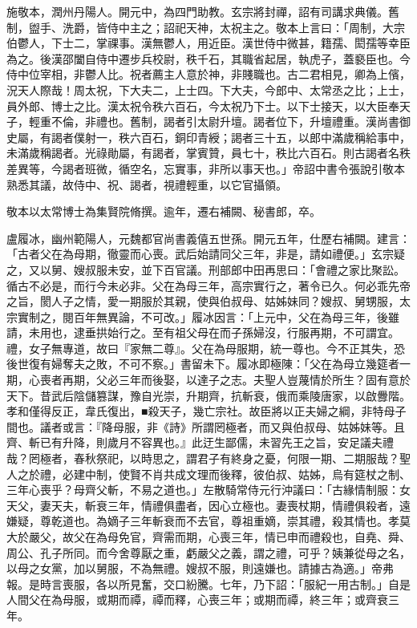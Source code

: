 \begin{pinyinscope}
 施敬本，潤州丹陽人。開元中，為四門助教。玄宗將封禪，詔有司講求典儀。舊制，盥手、洗爵，皆侍中主之；詔祀天神，太祝主之。敬本上言曰：「周制，大宗伯鬱人，下士二，掌祼事。漢無鬱人，用近臣。漢世侍中微甚，籍孺、閎孺等幸臣為之。後漢邵闔自侍中遷步兵校尉，秩千石，其職省起居，執虎子，蓋褻臣也。今侍中位宰相，非鬱人比。祝者薦主人意於神，非賤職也。古二君相見，卿為上儐，況天人際哉！周太祝，下大夫二，上士四。下大夫，今郎中、太常丞之比；上士，員外郎、博士之比。漢太祝令秩六百石，今太祝乃下士。以下士接天，以大臣奉天子，輕重不倫，非禮也。舊制，謁者引太尉升壇。謁者位下，升壇禮重。漢尚書御史屬，有謁者僕射一，秩六百石，銅印青綬；謁者三十五，以郎中滿歲稱給事中，未滿歲稱謁者。光祿勛屬，有謁者，掌賓贊，員七十，秩比六百石。則古謁者名秩差異等，今謁者班微，循空名，忘實事，非所以事天也。」帝詔中書令張說引敬本熟悉其議，故侍中、祝、謁者，視禮輕重，以它官攝領。



 敬本以太常博士為集賢院脩撰。逾年，遷右補闕、秘書郎，卒。



 盧履冰，幽州範陽人，元魏都官尚書義僖五世孫。開元五年，仕歷右補闕。建言：「古者父在為母期，徹靈而心喪。武后始請同父三年，非是，請如禮便。」玄宗疑之，又以舅、嫂叔服未安，並下百官議。刑部郎中田再思曰：「會禮之家比聚訟。循古不必是，而行今未必非。父在為母三年，高宗實行之，著令已久。何必乖先帝之旨，閡人子之情，愛一期服於其親，使與伯叔母、姑姊妹同？嫂叔、舅甥服，太宗實制之，閱百年無異論，不可改。」履冰因言：「上元中，父在為母三年，後雖請，未用也，逮垂拱始行之。至有祖父母在而子孫婦沒，行服再期，不可謂宜。禮，女子無專道，故曰『家無二尊』。父在為母服期，統一尊也。今不正其失，恐後世復有婦奪夫之敗，不可不察。」書留未下。履冰即極陳：「父在為母立幾筵者一期，心喪者再期，父必三年而後娶，以達子之志。夫聖人豈蔑情於所生？固有意於天下。昔武后陰儲篡謀，豫自光崇，升期齊，抗斬衰，俄而乘陵唐家，以啟釁階。孝和僅得反正，韋氏復出，■殺天子，幾亡宗社。故臣將以正夫婦之綱，非特母子間也。議者或言：『降母服，非《詩》所謂罔極者，而又與伯叔母、姑姊妹等。且齊、斬已有升降，則歲月不容異也。』此迂生鄙儒，未習先王之旨，安足議夫禮哉？罔極者，春秋祭祀，以時思之，謂君子有終身之憂，何限一期、二期服哉？聖人之於禮，必建中制，使賢不肖共成文理而後釋，彼伯叔、姑姊，烏有筵杖之制、三年心喪乎？母齊父斬，不易之道也。」左散騎常侍元行沖議曰：「古緣情制服：女天父，妻天夫，斬衰三年，情禮俱盡者，因心立極也。妻喪杖期，情禮俱殺者，遠嫌疑，尊乾道也。為嫡子三年斬衰而不去官，尊祖重嫡，崇其禮，殺其情也。孝莫大於嚴父，故父在為母免官，齊需而期，心喪三年，情已申而禮殺也，自堯、舜、周公、孔子所同。而今舍尊厭之重，虧嚴父之義，謂之禮，可乎？姨兼從母之名，以母之女黨，加以舅服，不為無禮。嫂叔不服，則遠嫌也。請據古為適。」帝弗報。是時言喪服，各以所見奮，交口紛騰。七年，乃下詔：「服紀一用古制。」自是人間父在為母服，或期而禫，禫而釋，心喪三年；或期而禫，終三年；或齊衰三年。




\end{pinyinscope}
